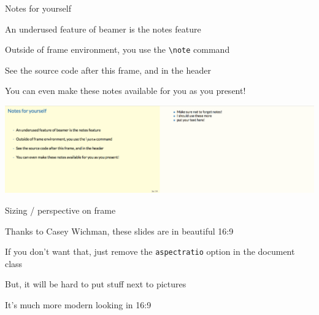 \documentclass[notes,11pt, aspectratio=169]{beamer}
\newenvironment{wideitemize}{\itemize\addtolength{\itemsep}{10pt}}{\enditemize}
\begin{document}
\begin{frame}{Notes for yourself}
  \begin{wideitemize}
    \item An underused feature of beamer is the notes feature
    \item Outside of frame environment, you use the \texttt{\textbackslash note} command
    \item See the source code after this frame, and in the header
    \item You can even make these notes available for you as you present!
  \end{wideitemize}
\begin{center}
  \includegraphics[width=.9\linewidth]{example_note.pdf}
\end{center}
\end{frame}
% 


\begin{frame}{Sizing / perspective on frame}
  \begin{wideitemize}
  \item Thanks to Casey Wichman, these slides are in beautiful 16:9
  \item If you don't want that, just remove the \texttt{aspectratio} option in the document class
  \item But, it will be hard to put stuff next to pictures
  \item It's much more modern looking in 16:9
  \end{wideitemize}
\end{frame}
\end{document}
